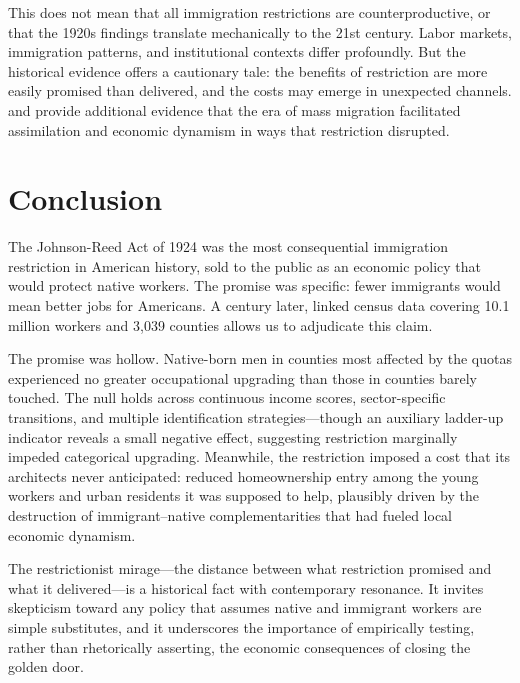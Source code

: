 \documentclass[12pt]{article}
\begin{document}
This does not mean that all immigration restrictions are counterproductive, or that the 1920s findings translate mechanically to the 21st century. Labor markets, immigration patterns, and institutional contexts differ profoundly. But the historical evidence offers a cautionary tale: the benefits of restriction are more easily promised than delivered, and the costs may emerge in unexpected channels. \citet{eriksson2020} and \citet{abramitzky2022} provide additional evidence that the era of mass migration facilitated assimilation and economic dynamism in ways that restriction disrupted.



\section{Conclusion}
\label{sec:conclusion}

The Johnson-Reed Act of 1924 was the most consequential immigration restriction in American history, sold to the public as an economic policy that would protect native workers. The promise was specific: fewer immigrants would mean better jobs for Americans. A century later, linked census data covering 10.1 million workers and 3,039 counties allows us to adjudicate this claim.

The promise was hollow. Native-born men in counties most affected by the quotas experienced no greater occupational upgrading than those in counties barely touched. The null holds across continuous income scores, sector-specific transitions, and multiple identification strategies---though an auxiliary ladder-up indicator reveals a small negative effect, suggesting restriction marginally impeded categorical upgrading. Meanwhile, the restriction imposed a cost that its architects never anticipated: reduced homeownership entry among the young workers and urban residents it was supposed to help, plausibly driven by the destruction of immigrant--native complementarities that had fueled local economic dynamism.

The restrictionist mirage---the distance between what restriction promised and what it delivered---is a historical fact with contemporary resonance. It invites skepticism toward any policy that assumes native and immigrant workers are simple substitutes, and it underscores the importance of empirically testing, rather than rhetorically asserting, the economic consequences of closing the golden door.
\end{document}
